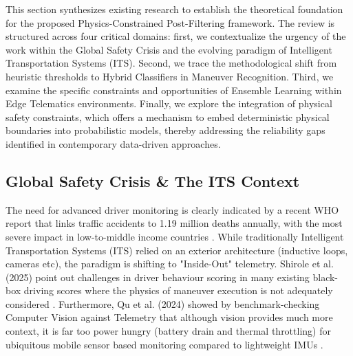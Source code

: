 \documentclass[pdflatex,sn-mathphys-num]{sn-jnl}
\theoremstyle{thmstyleone}
\theoremstyle{thmstyletwo}
\theoremstyle{thmstylethree}
\begin{document}
This section synthesizes existing research to establish the theoretical foundation for the proposed Physics-Constrained Post-Filtering framework. The review is structured across four critical domains: first, we contextualize the urgency of the work within the Global Safety Crisis and the evolving paradigm of Intelligent Transportation Systems (ITS). Second, we trace the methodological shift from heuristic thresholds to Hybrid Classifiers in Maneuver Recognition. Third, we examine the specific constraints and opportunities of Ensemble Learning within Edge Telematics environments. Finally, we explore the integration of physical safety constraints, which offers a mechanism to embed deterministic physical boundaries into probabilistic models, thereby addressing the reliability gaps identified in contemporary data-driven approaches.

\FloatBarrier
\subsection{Global Safety Crisis \& The ITS Context}
The need for advanced driver monitoring is clearly indicated by a recent WHO report that links traffic accidents to 1.19 million deaths annually, with the most severe impact in low-to-middle income countries \cite{who2023}. While traditionally Intelligent Transportation Systems (ITS) relied on an exterior architecture (inductive loops, cameras etc), the paradigm is shifting to "Inside-Out" telemetry. Shirole et al. (2025) point out challenges in driver behaviour scoring in many existing black-box driving scores where the physics of maneuver execution is not adequately considered \cite{shirole2025}.
 Furthermore, Qu et al. (2024) showed by benchmark-checking Computer Vision against Telemetry that although vision provides much more context, it is far too power hungry (battery drain and thermal throttling) for ubiquitous mobile sensor based monitoring compared to lightweight IMUs \cite{qu2024}.

\FloatBarrier
\end{document}
